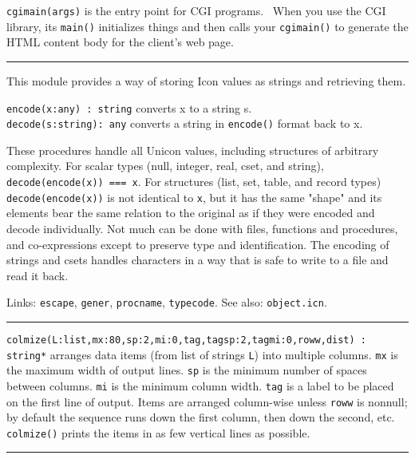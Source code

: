 \texttt{cgimain(args)} is the entry point for CGI programs. \ When you
use the CGI library, its \texttt{main()} initializes things and then
calls your \texttt{cgimain()} to generate the HTML content body for the
client's web page. 

\vspace{0.25cm}\hrule{}

This module provides a way of storing Icon values as strings and
retrieving them.

\texttt{encode(x:any) : string} converts x to a string s.\\
\texttt{decode(s:string): any} converts a string in \texttt{encode()}
format back to x.

These procedures handle all Unicon values, including structures of
arbitrary complexity. For scalar types (null,
integer, real, cset, and string), \texttt{decode(encode(x)) === x}.
For structures (list, set, table, and record types)
\texttt{decode(encode(x))} is not identical to \texttt{x}, but it has
the same "shape" and its elements bear the
same relation to the original as if they were encoded and decode
individually. Not much can be done with files, functions and
procedures, and co-expressions except to preserve type and
identification. The encoding of strings and csets handles
characters in a way that is safe to write to a file and read it back.

Links: \texttt{escape}, \texttt{gener}, \texttt{procname},
\texttt{typecode}. See also: \texttt{object.icn}. 

\vspace{0.25cm}\hrule{}

\texttt{colmize(L:list,mx:80,sp:2,mi:0,tag,tagsp:2,tagmi:0,roww,dist) :
string*} arranges data items (from list of strings
\texttt{L}) into multiple columns. \texttt{mx} is the maximum width of
output lines. \texttt{sp} is the minimum number of spaces between
columns. \texttt{mi} is the minimum column width. \texttt{tag} is a
label to be placed on the first line of output. Items are arranged
column-wise unless \texttt{roww} is nonnull; by default the sequence runs
down the first column, then down the second, etc. \texttt{colmize()}
prints the items in as few vertical lines as possible.

\vspace{0.25cm}\hrule{}

